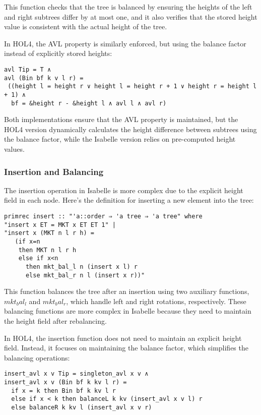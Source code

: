 \documentclass[12pt]{article}
\begin{document}
\begin{itemize}
This function checks that the tree is balanced by ensuring the heights of the left and right subtrees differ by at most one, and it also verifies that the stored height value is consistent with the actual height of the tree.

In HOL4, the AVL property is similarly enforced, but using the balance factor instead of explicitly stored heights:

\begin{verbatim}
avl Tip = T ∧
avl (Bin bf k v l r) =
 ((height l = height r ∨ height l = height r + 1 ∨ height r = height l + 1) ∧
  bf = &height r - &height l ∧ avl l ∧ avl r)
\end{verbatim}

Both implementations ensure that the AVL property is maintained, but the HOL4 version dynamically calculates the height difference between subtrees using the balance factor, while the Isabelle version relies on pre-computed height values.

\subsubsection{Insertion and Balancing}

The insertion operation in Isabelle is more complex due to the explicit height field in each node. Here’s the definition for inserting a new element into the tree:

\begin{verbatim}
primrec insert :: "'a::order ⇒ 'a tree ⇒ 'a tree" where
"insert x ET = MKT x ET ET 1" |
"insert x (MKT n l r h) = 
   (if x=n
    then MKT n l r h
    else if x<n
      then mkt_bal_l n (insert x l) r
      else mkt_bal_r n l (insert x r))"
\end{verbatim}

This function balances the tree after an insertion using two auxiliary functions, \(mkt_bal_l\) and \(mkt_bal_r\), which handle left and right rotations, respectively. These balancing functions are more complex in Isabelle because they need to maintain the height field after rebalancing.

In HOL4, the insertion function does not need to maintain an explicit height field. Instead, it focuses on maintaining the balance factor, which simplifies the balancing operations:

\begin{verbatim}
insert_avl x v Tip = singleton_avl x v ∧  
insert_avl x v (Bin bf k kv l r) =
  if x = k then Bin bf k kv l r  
  else if x < k then balanceL k kv (insert_avl x v l) r  
  else balanceR k kv l (insert_avl x v r)
\end{verbatim}


\end{itemize}
\end{document}
